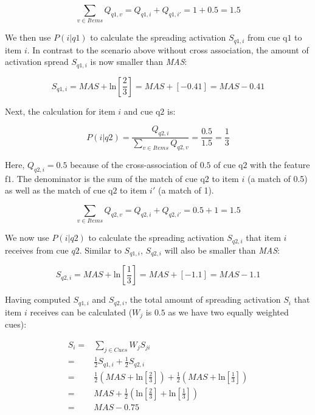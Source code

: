 \documentclass{cambridge7A}\usepackage[]{graphicx}\usepackage[]{color}
\begin{document}
\begin{enumerate}
\begin{equation}
\sum\limits_{v\in Items} Q_{q1,v} = Q_{q1,i} + Q_{q1,i'} = 1 + 0.5 = 1.5
\end{equation}

We then use $P(i|q1)$ to calculate the spreading activation $S_{q1,i}$ from cue q$1$ to item $i$. In contrast to the scenario above without cross association, the amount of activation spread $S_{q1,i}$ is now smaller than \textit{MAS}:

\begin{equation}
S_{q1,i} = \textit{MAS} + \text{ln}\left[\frac{2}{3}\right] =  \textit{MAS} + [-0.41] = \textit{MAS} - 0.41
\end{equation}

Next, the calculation for item $i$ and cue q$2$ is:

\begin{equation} \label{eq:newfannoxassoc4}
	P(i|q2) = \frac{Q_{q2,i}}{\sum\limits_{v\in Items} Q_{q2,v}} = \frac{0.5}{1.5} = \frac{1}{3}
\end{equation}

Here, $Q_{q2,i} = 0.5$ because of the cross-association of $0.5$ of  cue q$2$ with the feature f$1$. The denominator is the sum of the match of cue q$2$ to item $i$ (a match of 0.5) as well as the match of cue q$2$ to item $i'$ (a match of 1).

\begin{equation}
\sum\limits_{v\in Items} Q_{q2,v} = Q_{q2,i} + Q_{q2,i'} = 0.5 + 1 = 1.5
\end{equation}

We now use $P(i|q2)$ to calculate the  spreading activation  $S_{q2,i}$ that item $i$ receives from cue $q2$. Similar to  $S_{q1,i}$, $S_{q2,i}$ will also be smaller than \textit{MAS}: 


\begin{equation}
S_{q2,i} = \textit{MAS} + \text{ln}\left[\frac{1}{3} \right] = \textit{MAS} + [-1.1] = \textit{MAS} - 1.1 
\end{equation}

Having computed $S_{q1,i}$ and $S_{q2,i}$, the total amount of spreading activation $S_i$ that item $i$ receives can be calculated ($W_j$ is $0.5$ as we have two equally weighted cues):

\begin{equation}
\begin{split}
      S_i =& \sum\limits_{j\in Cues} W_{j} S_{ji} \\
          =& \frac{1}{2} S_{q1,i} + \frac{1}{2} S_{q2,i}\\
          =& \frac{1}{2}\left(\textit{MAS} + \text{ln}\left[\frac{2}{3}\right]\right) + \frac{1}{2}\left(\textit{MAS} + \text{ln}\left[\frac{1}{3}\right]\right)\\
          =& \textit{MAS} +  \frac{1}{2}\left(\text{ln}\left[\frac{2}{3}\right] + \text{ln}\left[\frac{1}{3}\right]\right) \\
          =& \textit{MAS} - 0.75
\end{split}
\end{equation}


\end{enumerate}
\end{document}

